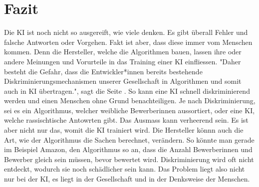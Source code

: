 \documentclass{article}
\begin{document}
\section{Fazit}
Die KI ist noch nicht so ausgereift, wie viele denken. Es gibt überall Fehler und falsche Antworten oder Vorgehen. Fakt ist aber, dass diese immer vom Menschen kommen. Denn die Hersteller, welche die Algorithmen bauen, lassen ihre oder andere Meinungen und Vorurteile in das Training einer KI einfliessen. "Daher besteht die Gefahr, dass die Entwickler*innen bereits bestehende Diskriminierungsmechanismen unserer Gesellschaft in Algorithmen und somit auch in KI übertragen.", sagt die Seite \citep{Digitalisierung}. So kann eine KI schnell diskriminierend werden und einen Menschen ohne Grund benachteiligen. Je nach Diskriminierung, sei es ein Algorithmus, welcher weibliche Bewerberinnen aussortiert, oder eine KI, welche rassischtische Antowrten gibt. Das Ausmass kann verheerend sein. Es ist aber nicht nur das, womit die KI trainiert wird. Die Hersteller könnn auch die Art, wie der Algorithmus die Sachen berechnet, verändern. So könnte man gerade im Beispiel Amazon, den Algorithmus so an, dass die Anzahl Bewerberinnen und Bewerber gleich sein müssen, bevor bewertet wird. Diskriminierung wird oft nicht entdeckt, wodurch sie noch schädlicher sein kann. Das Problem liegt also nicht nur bei der KI, es liegt in der Gesellschaft und in der Denksweise der Menschen. 

\nocite{*}

\printbibliography
\end{document}
